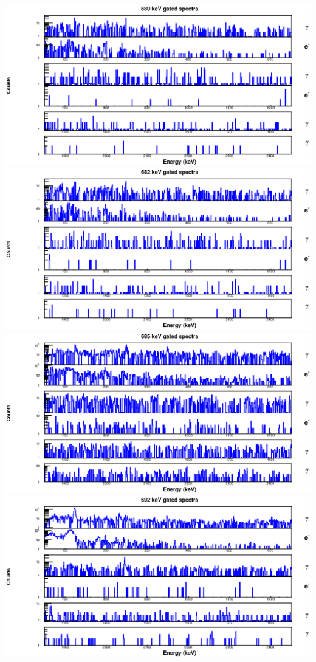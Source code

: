 \begin{landscape}
\includegraphics[scale=1.2]{154Gd_Appendix/680_combined.eps}
\includegraphics[scale=1.2]{154Gd_Appendix/682_combined.eps}
\includegraphics[scale=1.2]{154Gd_Appendix/685_combined.eps}
\includegraphics[scale=1.2]{154Gd_Appendix/692_combined.eps}

\end{landscape}
